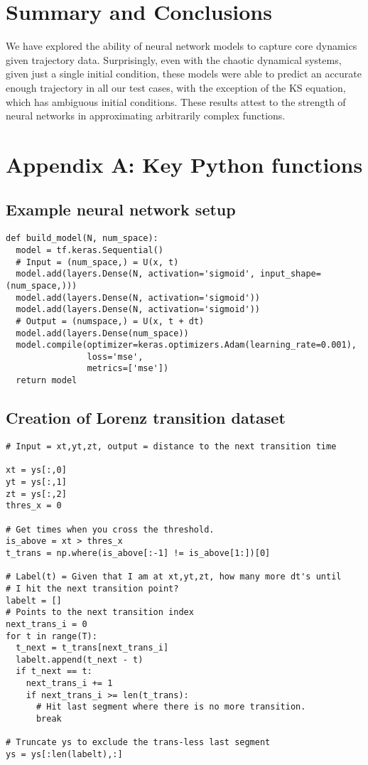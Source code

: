 \documentclass[letterpaper, 10 pt, conference]{ieeeconf}  %
\begin{document}
\section{Summary and Conclusions}
We have explored the ability of neural network models to capture core dynamics given trajectory data. Surprisingly, even with the chaotic dynamical systems, given just a single initial condition, these models were able to predict an accurate enough trajectory in all our test cases, with the exception of the KS equation, which has ambiguous initial conditions. These results attest to the strength of neural networks in approximating arbitrarily complex functions.



\clearpage

\onecolumn
\section*{Appendix A: Key Python functions}
\subsection*{Example neural network setup}
\begin{verbatim}
def build_model(N, num_space):
  model = tf.keras.Sequential()
  # Input = (num_space,) = U(x, t)
  model.add(layers.Dense(N, activation='sigmoid', input_shape=(num_space,)))
  model.add(layers.Dense(N, activation='sigmoid'))
  model.add(layers.Dense(N, activation='sigmoid'))
  # Output = (numspace,) = U(x, t + dt)
  model.add(layers.Dense(num_space))
  model.compile(optimizer=keras.optimizers.Adam(learning_rate=0.001),
                loss='mse',
                metrics=['mse'])
  return model
\end{verbatim}
\subsection*{Creation of Lorenz transition dataset}
\begin{verbatim}
# Input = xt,yt,zt, output = distance to the next transition time

xt = ys[:,0]
yt = ys[:,1]
zt = ys[:,2]
thres_x = 0

# Get times when you cross the threshold.
is_above = xt > thres_x
t_trans = np.where(is_above[:-1] != is_above[1:])[0]

# Label(t) = Given that I am at xt,yt,zt, how many more dt's until
# I hit the next transition point?
labelt = []
# Points to the next transition index
next_trans_i = 0
for t in range(T):
  t_next = t_trans[next_trans_i]
  labelt.append(t_next - t)
  if t_next == t:
    next_trans_i += 1
    if next_trans_i >= len(t_trans):
      # Hit last segment where there is no more transition.
      break

# Truncate ys to exclude the trans-less last segment
ys = ys[:len(labelt),:]
\end{verbatim}
\end{document}
